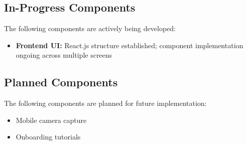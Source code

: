 \subsection{In-Progress Components}

The following components are actively being developed:

\begin{itemize}
    \item \textbf{Frontend UI:} React.js structure established; component implementation ongoing across multiple screens
\end{itemize}

\subsection{Planned Components}

The following components are planned for future implementation:

\begin{itemize}
    \item Mobile camera capture
    \item Onboarding tutorials
\end{itemize}
